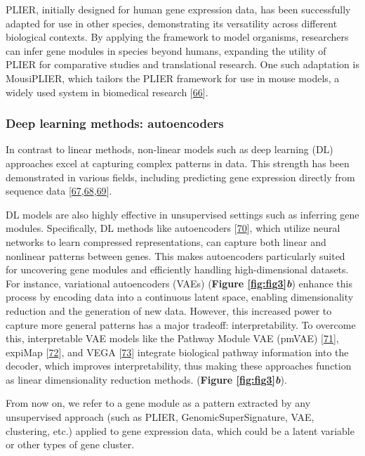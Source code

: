 PLIER, initially designed for human gene expression data, has been successfully adapted for use in other species, demonstrating its versatility across different biological contexts.
By applying the framework to model organisms, researchers can infer gene modules in species beyond humans, expanding the utility of PLIER for comparative studies and translational research.
One such adaptation is MousiPLIER, which tailors the PLIER framework for use in mouse models, a widely used system in biomedical research {[}\protect\hyperlink{ref-1CDQw6VDO}{66}{]}.

\hypertarget{deep-learning-methods-autoencoders}{%
\subsubsection{Deep learning methods: autoencoders}\label{deep-learning-methods-autoencoders}}

In contrast to linear methods, non-linear models such as deep learning (DL) approaches excel at capturing complex patterns in data.
This strength has been demonstrated in various fields, including predicting gene expression directly from sequence data {[}\protect\hyperlink{ref-1HNaN8NTb}{67},\protect\hyperlink{ref-CdrNvVBn}{68},\protect\hyperlink{ref-Gy0Zkruj}{69}{]}.

DL models are also highly effective in unsupervised settings such as inferring gene modules.
Specifically, DL methods like autoencoders {[}\protect\hyperlink{ref-NLVTJ9Lj}{70}{]}, which utilize neural networks to learn compressed representations, can capture both linear and nonlinear patterns between genes.
This makes autoencoders particularly suited for uncovering gene modules and efficiently handling high-dimensional datasets.
For instance, variational autoencoders (VAEs) (\textbf{Figure \ref{fig:fig3}\emph{b}}) enhance this process by encoding data into a continuous latent space, enabling dimensionality reduction and the generation of new data.
However, this increased power to capture more general patterns has a major tradeoff: interpretability.
To overcome this, interpretable VAE models like the Pathway Module VAE (pmVAE) {[}\protect\hyperlink{ref-nGVsOd2S}{71}{]}, expiMap {[}\protect\hyperlink{ref-JkqcQgM7}{72}{]}, and VEGA {[}\protect\hyperlink{ref-170T6ip47}{73}{]} integrate biological pathway information into the decoder, which improves interpretability, thus making these approaches function as linear dimensionality reduction methods.
(\textbf{Figure \ref{fig:fig3}\emph{b}}).

From now on, we refer to a gene module as a pattern extracted by any unsupervised approach (such as PLIER, GenomicSuperSignature, VAE, clustering, etc.) applied to gene expression data, which could be a latent variable or other types of gene cluster.

